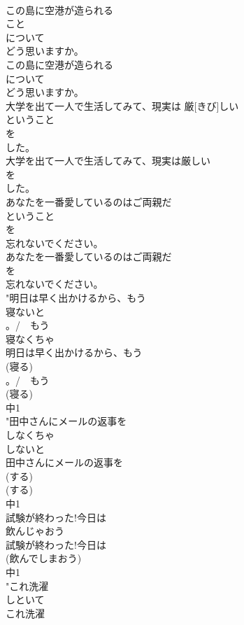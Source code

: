 \documentclass[8pt]{extreport}
\begin{document}
\begin{CJK}{UTF8}{min}
\\	この島に空港が造られる
\\	こと
\\	について
\\	どう思いますか。
\\	この島に空港が造られる
\\	について
\\	どう思いますか。
\\	大学を出て一人で生活してみて、現実は  厳[きび]しい
\\	ということ
\\	を
\\	した。
\\	大学を出て一人で生活してみて、現実は厳しい
\\	を
\\	した。
\\	あなたを一番愛しているのはご両親だ
\\	ということ
\\	を
\\	忘れないでください。
\\	あなたを一番愛しているのはご両親だ
\\	を
\\	忘れないでください。
\\	"明日は早く出かけるから、もう
\\	寝ないと
\\	。/　もう
\\	寝なくちゃ
\\	明日は早く出かけるから、もう
\\	(寝る)
\\	。/　もう
\\	(寝る)
\\	中1
\\	"田中さんにメールの返事を
\\	しなくちゃ
\\	しないと
\\	田中さんにメールの返事を
\\	(する)
\\	(する)
\\	中1
\\	試験が終わった!今日は
\\	飲んじゃおう
\\	試験が終わった!今日は
\\	(飲んでしまおう)
\\	中1
\\	"これ洗濯
\\	しといて
\\	これ洗濯

\end{CJK}
\end{document}
